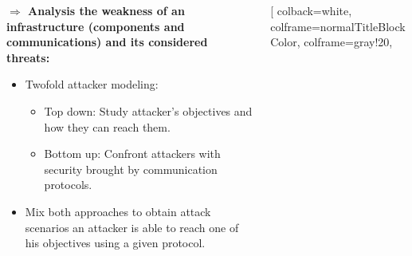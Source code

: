 \documentclass{beamer}
\begin{document}
\begin{frame}[fragile]{}
    \vspace{.25em}
    \begin{tcolorbox}[adjusted title={\centering\large Attack models}]
        \vspace{.5em}
        \begin{columns}[T]
            \begin{column}{.35\textwidth}
                \begin{tcolorbox}[
                colback=white, %
                colframe=normalTitleBlockColor, %
                colframe=gray!20, %
                boxrule=1mm,
                coltext=black, %
                coltitle=black, %
                bottom=2mm,
                equal height group=D,
                valign = center,
                adjusted title={\large Objectives}]
                    \vspace{.5em}
                    {\bf $\Rightarrow$ Analysis the weakness of an infrastructure (components and communications) and its considered threats:}
                    \begin{itemize}
                        \item Twofold attacker modeling:
                        \begin{itemize}
                            \item Top down: Study attacker's objectives and how they can reach them.
                            \item Bottom up: Confront attackers with security brought by communication protocols.
                        \end{itemize}
                        \vspace{.5em}
                        \item Mix both approaches to obtain attack scenarios an attacker is able to reach one of his objectives using a given protocol.
                    \end{itemize}
                \end{tcolorbox}
            \end{column}
            \begin{column}{.65\textwidth}
                \begin{tcolorbox}[
                colback=white, %
                colframe=normalTitleBlockColor, %
                colframe=gray!20, %

\end{tcolorbox}
\end{column}
\end{columns}
\end{tcolorbox}
\end{frame}
\end{document}

